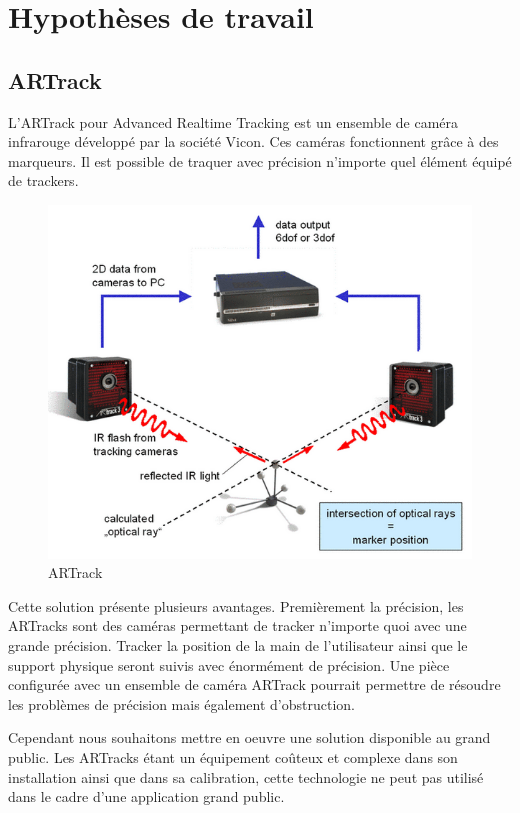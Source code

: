 \chapter{Hypothèses de travail}

\section{ARTrack}

L’ARTrack  pour Advanced Realtime Tracking est un ensemble de caméra infrarouge développé par la société Vicon. Ces caméras fonctionnent grâce à des marqueurs. Il est possible de traquer avec précision n’importe quel élément équipé de trackers. 

\begin{figure}[!ht]
	\center	
	\includegraphics[scale=0.5]{image/artrack.png}
	\caption{ARTrack}
\end{figure}

Cette solution présente plusieurs avantages. Premièrement la précision, les ARTracks sont des caméras permettant de tracker n’importe quoi avec une grande précision. Tracker la position de la main de l’utilisateur ainsi que le support physique seront suivis avec énormément de précision. Une pièce configurée avec un ensemble de caméra ARTrack pourrait permettre de résoudre les problèmes de précision mais également d’obstruction.

Cependant nous souhaitons mettre en oeuvre une solution disponible au grand public. Les ARTracks étant un équipement coûteux et complexe dans son installation ainsi que dans sa  calibration, cette technologie ne peut pas utilisé dans le cadre d’une application grand public.

